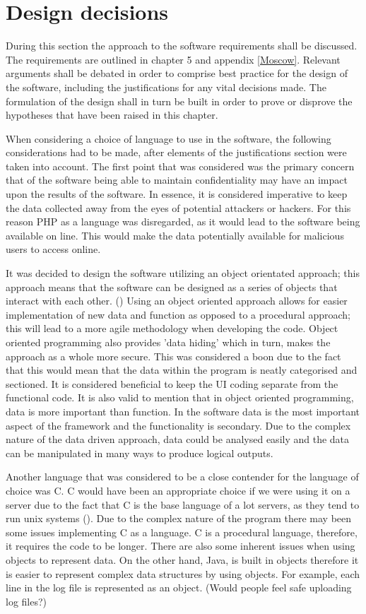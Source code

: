 \section{Design decisions}

During this section the approach to the software requirements shall be discussed. The requirements are outlined in chapter 5 and appendix \ref{Moscow}. Relevant arguments shall be debated in order to comprise best practice for the design of the software, including the justifications for any vital decisions made. The formulation of the design shall in turn be built in order to prove or disprove the hypotheses that have been raised in this chapter. 

When considering a choice of language to use in the software, the following considerations had to be made, after elements of the justifications section were taken into account. The first point that was considered was the primary concern that of the software being able to maintain confidentiality may have an impact upon the results of the software. In essence, it is considered imperative to keep the data collected away from the eyes of potential attackers or hackers. For this reason PHP as a language was disregarded, as it would lead to the software being available on line. This would make the data potentially available for malicious users to access online. 

It was decided to design the software utilizing an object orientated approach; this approach means that the software can be designed as a series of objects that interact with each other. (\cite{OOP}) Using an object oriented approach allows for easier implementation of new data and function as opposed to a procedural approach; this will lead to a more agile methodology when developing the code. Object oriented programming also provides 'data hiding' which in turn, makes the approach as a whole more secure. This was considered a boon due to the fact that this would mean that the data within the program is neatly categorised and sectioned. It is considered beneficial to keep the UI coding separate from the functional code. It is also valid to mention that in object oriented programming, data is more important than function. In the software data is the most important aspect of the framework and the functionality is secondary. Due to the complex nature of the data driven approach, data could be analysed easily and the data can be manipulated in many ways to produce logical outputs.

Another language that was considered to be a close contender for the language of choice was C. C would have been an appropriate choice if we were using it on a server due to the fact that C is the base language of a lot servers, as they tend to run unix systems (\cite{ehost}). Due to the complex nature of the program there may been some issues implementing C as a language. C is a procedural language, therefore, it requires the code to be longer. There are also some inherent issues when using objects to represent data. On the other hand, Java, is built in objects therefore it is easier to represent complex data structures by using objects. For example, each line in the log file is represented as an object. (Would people feel safe uploading log files?)

